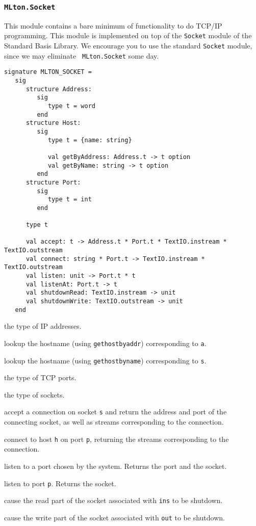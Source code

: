\subsubsection{{\tt MLton.Socket}}
This module contains a bare minimum of functionality to do TCP/IP
programming.  This module is implemented on top of the {\tt Socket}
module of the Standard Basis Library.  We encourage you to use the
standard {\tt Socket} module, since we may eliminate {\tt
MLton.Socket} some day.
\begin{verbatim}
signature MLTON_SOCKET =
   sig
      structure Address:
         sig
            type t = word
         end
      structure Host:
         sig
            type t = {name: string}

            val getByAddress: Address.t -> t option
            val getByName: string -> t option
         end
      structure Port:
         sig
            type t = int
         end

      type t

      val accept: t -> Address.t * Port.t * TextIO.instream * TextIO.outstream
      val connect: string * Port.t -> TextIO.instream * TextIO.outstream
      val listen: unit -> Port.t * t
      val listenAt: Port.t -> t
      val shutdownRead: TextIO.instream -> unit
      val shutdownWrite: TextIO.outstream -> unit
   end
\end{verbatim}

\begin{description}

the type of IP addresses.

lookup the hostname (using {\tt gethostbyaddr}) corresponding to {\tt a}.

lookup the hostname (using {\tt gethostbyname}) corresponding to {\tt s}.

the type of TCP ports.

the type of sockets.

accept a connection on socket {\tt s} and return the address and
port of the connecting socket, as well as streams corresponding to the
connection.

connect to host {\tt h} on port {\tt p}, returning the streams
corresponding to the connection.

listen to a port chosen by the system.  Returns the port and the socket.

listen to port {\tt p}.  Returns the socket.

cause the read part of the socket associated with {\tt ins} to be shutdown.

cause the write part of the socket associated with {\tt out} to be shutdown.
\end{description}

